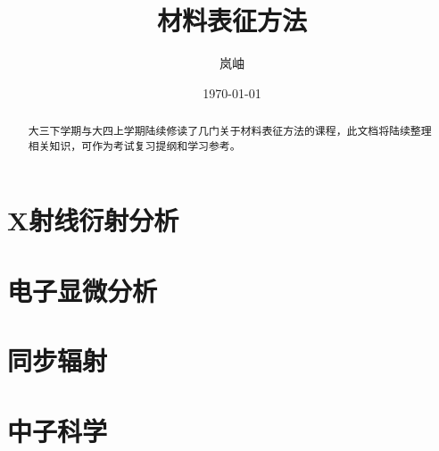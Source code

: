\documentclass[12pt,a4paper]{article}
\title{\heiti 材料表征方法}
\author{\kaishu 岚岫}
\date{\today}
\begin{document}
    \maketitle
\begin{abstract}
    大三下学期与大四上学期陆续修读了几门关于材料表征方法的课程，此文档将陆续整理相关知识，可作为考试复习提纲和学习参考。
\end{abstract}
\section{X射线衍射分析}
\section{电子显微分析}
\section{同步辐射}
\section{中子科学}
\end{document}
